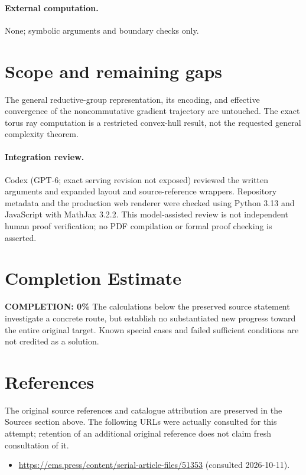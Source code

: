 \documentclass[11pt]{article}
\begin{document}
\paragraph{External computation.} None; symbolic arguments and boundary checks only.
\section{Scope and remaining gaps}
The general reductive-group representation, its encoding, and effective convergence of the noncommutative gradient trajectory are untouched. The exact torus ray computation is a restricted convex-hull result, not the requested general complexity theorem.
\paragraph{Integration review.} Codex (GPT-6; exact serving revision not exposed) reviewed the written arguments and expanded layout and source-reference wrappers. Repository metadata and the production web renderer were checked using Python 3.13 and JavaScript with MathJax 3.2.2. This model-assisted review is not independent human proof verification; no PDF compilation or formal proof checking is asserted.

\section{Completion Estimate}
\noindent\textbf{COMPLETION: 0\%}
The calculations below the preserved source statement investigate a concrete route,
but establish no substantiated new progress toward the entire original target.
Known special cases and failed sufficient conditions are not credited as a solution.
\section{References}
The original source references and catalogue attribution are preserved in the
Sources section above. The following URLs were actually consulted for this attempt;
retention of an additional original reference does not claim fresh consultation of it.
\begin{itemize}
\item \url{https://ems.press/content/serial-article-files/51353} (consulted 2026-10-11). 
\end{itemize}
\end{document}
